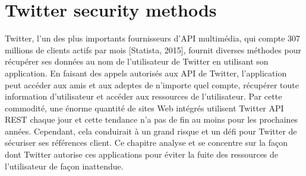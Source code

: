 \chapter{Twitter security methods}
Twitter, l'un des plus importants fournisseurs d'API multimédia, qui compte 307 millions de clients actifs par mois [Statista, 2015], fournit diverses méthodes pour récupérer ses données au nom de l'utilisateur de Twitter en utilisant son application. En faisant des appels autorisés aux API de Twitter, l'application peut accéder aux amis et aux adeptes de n'importe quel compte, récupérer toute information d'utilisateur et accéder aux ressources de l'utilisateur. Par cette commodité, une énorme quantité de sites Web intégrés utilisent Twitter API REST chaque jour et cette tendance n'a pas de fin au moins pour les prochaines années. Cependant, cela conduirait à un grand risque et un défi pour Twitter de sécuriser ses références client. Ce chapitre analyse et se concentre sur la façon dont Twitter autorise ces applications pour éviter la fuite des ressources de l'utilisateur de façon inattendue.
